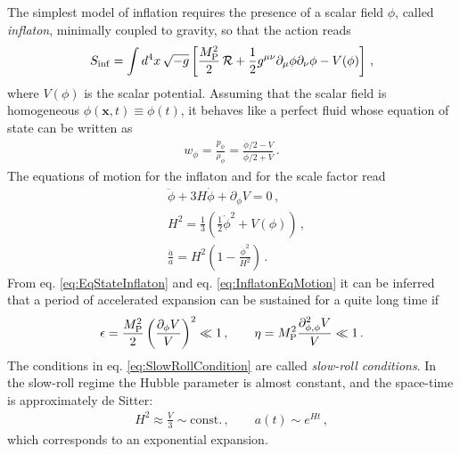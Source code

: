 \documentclass[12pt,a4paper]{book}
\begin{document}
The simplest model of inflation requires the presence of a scalar field $\phi$, called \textit{inflaton}, minimally coupled to gravity, so that the action reads
\begin{align}
\label{eq:InflationLagrangian}
S_{\rm inf} = \int d^4x\, \sqrt{-g} \left[\frac{M_{\rm P}^2}{2} \, \mathcal{R} + \frac{1}{2} g^{\mu \nu} \partial_\mu \phi \partial_\nu \phi - V(\phi)\right]\,,
\end{align}
where $V(\phi)$ is the scalar potential. Assuming that the scalar field is homogeneous $\phi(\mathbf{x},t) \equiv \phi(t)$, it behaves like a perfect fluid whose equation of state can be written as
\begin{align}
\label{eq:EqStateInflaton}
w_\phi = \frac{p_\phi}{\rho_\phi} = \frac{\dot{\phi}/2 - V}{\dot{\phi}/2 + V}\,.
\end{align}
The equations of motion for the inflaton and for the scale factor read
\begin{align}
\label{eq:InflatonEqMotion}
&\ddot\phi + 3 H \dot\phi + \partial_\phi V = 0 \,, \nonumber \\
&H^2 = \frac{1}{3} \left(\frac{1}{2} \dot{\phi}^2 + V(\phi) \right) \,, \nonumber \\
& \frac{\ddot{a}}{a} = H^2 \left(1 - \frac{\dot{\phi}^2}{H^2}\right) \,.
\end{align}
From eq. \eqref{eq:EqStateInflaton} and eq. \eqref{eq:InflatonEqMotion} it can be inferred that a period of accelerated expansion can be sustained for a quite long time if
\begin{align}
\label{eq:SlowRollCondition}
\epsilon = \frac{M_{\rm P}^2}{2} \left(\frac{\partial_{\phi}V}{V}\right)^2 \ll 1 \,, \qquad \eta = M_{\rm P}^2 \frac{\partial^2_{\phi, \phi} V}{V} \ll 1 \,.
\end{align}
The conditions in eq. \eqref{eq:SlowRollCondition} are called \textit{slow-roll conditions}. In the slow-roll regime the Hubble parameter is almost constant, and the space-time is approximately de Sitter:
\begin{align}
\label{eq:deSitterSlowRoll}
H^2 \approx \frac{V}{3} \sim \text{const.} \,, \qquad a(t) \sim e^{H t} \,,
\end{align}
which corresponds to an exponential expansion.\\
\end{document}
